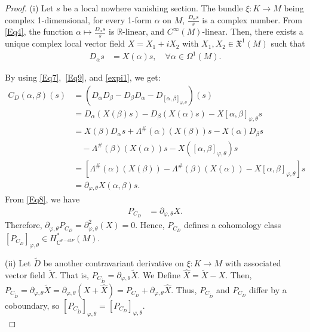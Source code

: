 \documentclass[a4paper,10pt]{article}
\numberwithin{equation}{section}
\theoremstyle{plain}
\newcommand{\CD}{C_D}
\newcommand{\PCD}{P_{\CD}}
\begin{document}
	\begin{proof}
		
		\noindent(i) Let \(s\) be a local nowhere vanishing section.  The bundle  $\xi: K\to M$  being complex 1-dimensional, for every 1-form  $\alpha$ on $M$,   $\frac{D_\alpha s}{s}$ is a complex number.  From \eqref{Eq4}, the function $\alpha\mapsto  \frac{D_\alpha s}{s}$ is $\mathbb{R}$-linear, and $C^\infty(M)$-linear. Then, there exists a unique complex local vector field $X = X_1 + iX_2$  with $X_1,X_2\in\mathfrak{X}^1(M)$  such that
		\begin{align}\label{Eq9}
		D_\alpha s&= X(\alpha) s, \quad \forall \alpha \in \Omega^1(M).
		\end{align}
		
		By using \eqref{Eq7},\  \eqref{Eq9}, and \eqref{expi1}, we get:
		\[
		\begin{aligned}
		\CD(\alpha,\beta)(s) &= (D_\alpha D_\beta - D_\beta D_\alpha - D_{[\alpha,\beta]_{\varphi,\theta}})(s) \\
		&= D_\alpha(X(\beta) s) - D_\beta(X(\alpha) s) - X[\alpha,\beta]_{\varphi,\theta}s \\
		&= X(\beta) D_\alpha s + \Lambda^\#(\alpha)(X(\beta)) s - X(\alpha) D_\beta s \\
		&\quad - \Lambda^\#(\beta)(X(\alpha)) s - X([\alpha,\beta]_{\varphi,\theta}) s \\
		&= \left[ \Lambda^\#(\alpha)(X(\beta)) - \Lambda^\#(\beta)(X(\alpha)) - X[\alpha,\beta]_{\varphi,\theta} \right] s\\
		&=\partial_{\varphi,\theta} X(\alpha,\beta)s.
		\end{aligned}
		\]
		From \eqref{Eq8}, we have
		\begin{align}\label{Eq10}
		\PCD &= \partial_{\varphi,\theta} X.
		\end{align}
		Therefore, $\partial_{\varphi,\theta} \PCD = \partial_{\varphi,\theta}^2(X)=0$.  Hence, $\PCD$ defines a cohomology class  \([\PCD]_{\varphi,\theta} \in H_{\mathbb{C}^{\theta-atP}}^{*}(M)\).
		
		\noindent(ii) Let \(\widetilde{D}\) be another contravariant derivative on $\xi: K\to M$  with associated  vector field \(\widetilde{X}\). That is, $P_{C_{\widetilde{D}}}= \partial_{\varphi,\theta} \widetilde{X}$. We  Define \(\widehat{X} = \widetilde{X} - X\). Then,
		$P_{C_{\widetilde{D}}}= \partial_{\varphi,\theta} \widetilde{X} = \partial_{\varphi,\theta} (X + \widehat{X}) = \PCD + \partial_{\varphi,\theta} \widehat{X}$.
		Thus, $P_{C_{\widetilde{D}}}$ and $\PCD$ differ by a coboundary, so $[ P_{C_{\widetilde{D} }}]_{\varphi,\theta} = [\PCD]_{\varphi,\theta}$.\\
		

\end{proof}
\end{document}
